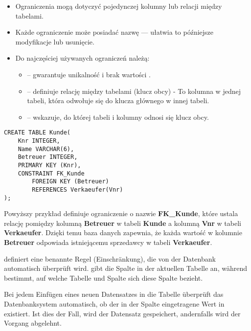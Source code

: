 \begin{itemize}
    \item Ograniczenia mogą dotyczyć pojedynczej kolumny lub relacji między tabelami.
    \item Każde ograniczenie może posiadać nazwę — ułatwia to późniejsze modyfikacje lub usunięcie.
    \item Do najczęściej używanych ograniczeń należą:
    \begin{itemize}
        \item {} – gwarantuje unikalność i brak wartości .
        \item {} – definiuje relację między tabelami (klucz obcy) - To kolumna w jednej tabeli, która odwołuje się do klucza głównego w innej tabeli.
        \item {} – wskazuje, do której tabeli i kolumny odnosi się klucz obcy.
    \end{itemize}
\end{itemize}

\begin{lstlisting}[style=sqlstyle]
CREATE TABLE Kunde(
    Knr INTEGER,
    Name VARCHAR(6),
    Betreuer INTEGER,
    PRIMARY KEY (Knr),
    CONSTRAINT FK_Kunde
        FOREIGN KEY (Betreuer)
        REFERENCES Verkaeufer(Vnr)
);
\end{lstlisting}

Powyższy przykład definiuje ograniczenie o nazwie \textbf{FK\_Kunde}, 
które ustala relację pomiędzy kolumną \textbf{Betreuer} w tabeli \textbf{Kunde} 
a kolumną \textbf{Vnr} w tabeli \textbf{Verkaeufer}. 
Dzięki temu baza danych zapewnia, że każda wartość w kolumnie \textbf{Betreuer} 
odpowiada istniejącemu sprzedawcy w tabeli \textbf{Verkaeufer}.

\begin{tcolorbox}[blue, title={Hinweis}]
     definiert eine benannte Regel (Einschränkung), 
    die von der Datenbank automatisch überprüft wird.  
     gibt die Spalte in der aktuellen Tabelle an, 
    während  bestimmt, auf welche Tabelle und Spalte 
    sich diese Spalte bezieht.  

    Bei jedem Einfügen eines neuen Datensatzes in die Tabelle  
    überprüft das Datenbanksystem automatisch, ob der in der Spalte 
     eingetragene Wert in  existiert.  
    Ist dies der Fall, wird der Datensatz gespeichert,  
    andernfalls wird der Vorgang abgelehnt.
\end{tcolorbox}


